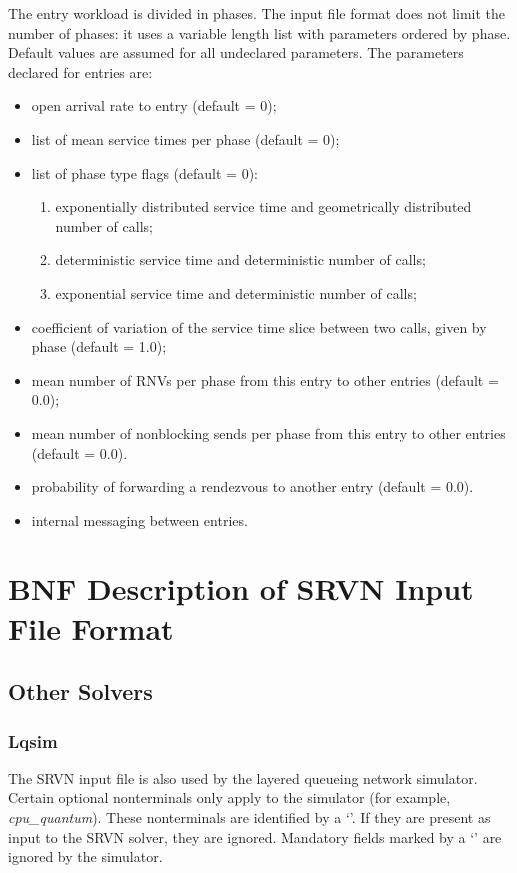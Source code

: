 \documentclass{article}
\begin{document}
\begin{description}
The entry workload is divided in phases.  The input file format does
not limit the number of phases: it uses a variable length list with
parameters ordered by phase.  Default values are assumed for all
undeclared parameters.  The parameters declared for entries are:

\begin{itemize}
\item open arrival rate to entry (default = 0);
\item list of mean service times per phase (default = 0);
\item list of phase type flags (default = 0):
  \begin{enumerate}
  \item exponentially distributed service time and geometrically
    distributed number of calls;
  \item deterministic service time and deterministic number of
    calls;
  \item exponential service time and deterministic number of calls;
  \end{enumerate}
\item coefficient of variation of the service time slice between two
  calls, given by phase (default = 1.0);
\item mean number of RNVs per phase from this entry to other entries
  (default = 0.0);
\item mean number of nonblocking sends per phase from this entry to
  other entries (default = 0.0).
\item probability of forwarding a rendezvous to another entry (default
  = 0.0).
\item internal messaging between entries.
\end{itemize}
\end{description}

\section{BNF Description of SRVN Input File Format}



\subsection{Other Solvers}

\subsubsection{Lqsim}
The SRVN input file is also used by the layered queueing network simulator.
 Certain optional nonterminals only apply to the
simulator (for example, {\em cpu\_quantum}).  These nonterminals are
identified by a `\dag'.  If they are present as input to the SRVN
solver, they are ignored.  Mandatory fields marked by a `\ddag' are
ignored by the simulator.
\end{document}
